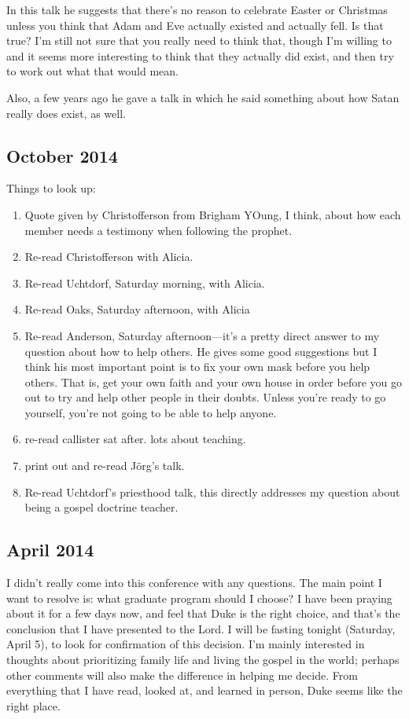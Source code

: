 In this talk he suggests that there's no reason to celebrate Easter or Christmas unless you think that Adam and Eve actually existed and actually fell. Is that true? I'm still not sure that you really need to think that, though I'm willing to and it seems more interesting to think that they actually did exist, and then try to work out what that would mean.

Also, a few years ago he gave a talk in which he said something about how Satan really does exist, as well.

\subsection{October 2014}

Things to look up:

\begin{enumerate}
\item Quote given by Christofferson from Brigham YOung, I think, about how each member needs a testimony when following the prophet.
\item Re-read Christofferson with Alicia.
\item Re-read Uchtdorf, Saturday morning, with Alicia.
\item Re-read Oaks, Saturday afternoon, with Alicia
\item Re-read Anderson, Saturday afternoon---it's a pretty direct answer to my question about how to help others. He gives some good suggestions but I think his most important point is to fix your own mask before you help others. That is, get your own faith and your own house in order before you go out to try and help other people in their doubts. Unless you're ready to go yourself, you're not going to be able to help anyone.
\item re-read callister sat after. lots about teaching.
\item print out and re-read J\"{o}rg's talk.
\item Re-read Uchtdorf's priesthood talk, this directly addresses my question about being a gospel doctrine teacher.
\end{enumerate}

\subsection{April 2014}

I didn't really come into this conference with any questions. The main point I want to resolve is: what graduate program should I choose? I have been praying about it for a few days now, and feel that Duke is the right choice, and that's the conclusion that I have presented to the Lord. I will be fasting tonight (Saturday, April 5), to look for confirmation of this decision. I'm mainly interested in thoughts about prioritizing family life and living the gospel in the world; perhaps other comments will also make the difference in helping me decide. From everything that I have read, looked at, and learned in person, Duke seems like the right place. 

